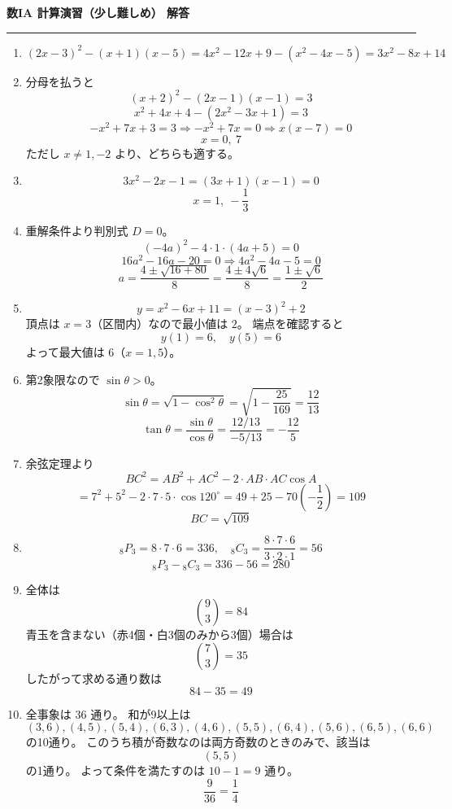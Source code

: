 \documentclass[lualatex,ja=standard]{bxjsarticle}
\begin{document}
\noindent\textbf{数IA 計算演習（少し難しめ） 解答}
\hrule
\vspace{0.8em}

\begin{enumerate}
\item
\[
(2x-3)^2-(x+1)(x-5)
=4x^2-12x+9-(x^2-4x-5)
=3x^2-8x+14
\]

\item 分母を払うと
\[
(x+2)^2-(2x-1)(x-1)=3
\]
\[
x^2+4x+4-(2x^2-3x+1)=3
\]
\[
-x^2+7x+3=3
\Rightarrow -x^2+7x=0
\Rightarrow x(x-7)=0
\]
\[
x=0,\ 7
\]
ただし $x\neq 1,-2$ より、どちらも適する。

\item
\[
3x^2-2x-1=(3x+1)(x-1)=0
\]
\[
x=1,\ -\frac13
\]

\item 重解条件より判別式 $D=0$。
\[
(-4a)^2-4\cdot 1\cdot(4a+5)=0
\]
\[
16a^2-16a-20=0
\Rightarrow 4a^2-4a-5=0
\]
\[
a=\frac{4\pm\sqrt{16+80}}{8}=\frac{4\pm 4\sqrt6}{8}=\frac{1\pm\sqrt6}{2}
\]

\item
\[
y=x^2-6x+11=(x-3)^2+2
\]
頂点は $x=3$（区間内）なので最小値は $2$。
端点を確認すると
\[
y(1)=6,\quad y(5)=6
\]
よって最大値は $6$（$x=1,5$）。

\item 第2象限なので $\sin\theta>0$。
\[
\sin\theta=\sqrt{1-\cos^2\theta}=\sqrt{1-\frac{25}{169}}=\frac{12}{13}
\]
\[
\tan\theta=\frac{\sin\theta}{\cos\theta}=\frac{12/13}{-5/13}=-\frac{12}{5}
\]

\item 余弦定理より
\[
BC^2=AB^2+AC^2-2\cdot AB\cdot AC\cos A
\]
\[
=7^2+5^2-2\cdot 7\cdot 5\cdot\cos120^\circ
=49+25-70\left(-\frac12\right)
=109
\]
\[
BC=\sqrt{109}
\]

\item
\[
{}_8P_3=8\cdot 7\cdot 6=336,\quad {}_8C_3=\frac{8\cdot 7\cdot 6}{3\cdot 2\cdot 1}=56
\]
\[
{}_8P_3-{}_8C_3=336-56=280
\]

\item 全体は
\[
\binom{9}{3}=84
\]
青玉を含まない（赤4個・白3個のみから3個）場合は
\[
\binom{7}{3}=35
\]
したがって求める通り数は
\[
84-35=49
\]

\item 全事象は $36$ 通り。
和が9以上は
\[
(3,6),(4,5),(5,4),(6,3),
(4,6),(5,5),(6,4),
(5,6),(6,5),
(6,6)
\]
の10通り。
このうち積が奇数なのは両方奇数のときのみで、該当は
\[
(5,5)
\]
の1通り。
よって条件を満たすのは $10-1=9$ 通り。
\[
\frac{9}{36}=\frac14
\]
\end{enumerate}
\end{document}
